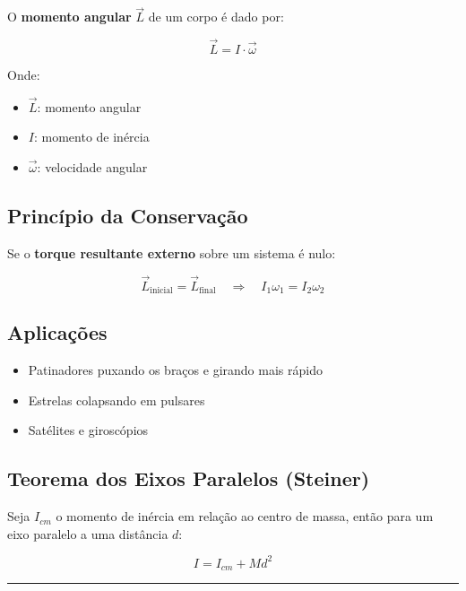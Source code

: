 \documentclass[a4paper,12pt]{article}
\begin{document}
O \textbf{momento angular} \( \vec{L} \) de um corpo é dado por:

\[
\vec{L} = I \cdot \vec{\omega}
\]

Onde:
\begin{itemize}
  \item \( \vec{L} \): momento angular
  \item \( I \): momento de inércia
  \item \( \vec{\omega} \): velocidade angular
\end{itemize}

\subsection*{Princípio da Conservação}

Se o \textbf{torque resultante externo} sobre um sistema é nulo:

\[
\vec{L}_{\text{inicial}} = \vec{L}_{\text{final}}
\quad \Rightarrow \quad I_1 \omega_1 = I_2 \omega_2
\]

\subsection*{Aplicações}

\begin{itemize}
  \item Patinadores puxando os braços e girando mais rápido
  \item Estrelas colapsando em pulsares
  \item Satélites e giroscópios
\end{itemize}

\subsection*{Teorema dos Eixos Paralelos (Steiner)}
Seja $I_{cm}$ o momento de inércia em relação ao centro de massa, então para um eixo paralelo a uma distância $d$:

\[
\boxed{ 
I = I_{cm} + M d^2
}
\]

\noindent\rule{\linewidth}{0.6pt}\\
\end{document}
